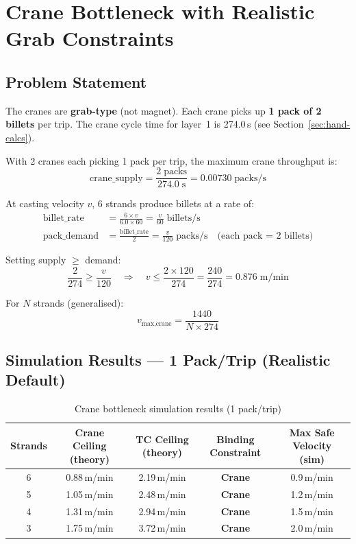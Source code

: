 \documentclass[11pt,a4paper]{article}
\begin{document}
\section{Crane Bottleneck with Realistic Grab Constraints}
\label{sec:crane-bottleneck}

\subsection{Problem Statement}

The cranes are \textbf{grab-type} (not magnet). Each crane picks up \textbf{1 pack of 2 billets} per trip. The crane cycle time for layer~1 is 274.0\,s (see Section~\ref{sec:hand-calcs}).

With 2 cranes each picking 1 pack per trip, the maximum crane throughput is:
\begin{equation}
\text{crane\_supply} = \frac{2\;\text{packs}}{274.0\;\text{s}} = 0.00730\;\text{packs/s}
\end{equation}

At casting velocity $v$, 6 strands produce billets at a rate of:
\begin{align}
\text{billet\_rate} &= \frac{6 \times v}{6.0 \times 60} = \frac{v}{60}\;\text{billets/s} \\
\text{pack\_demand} &= \frac{\text{billet\_rate}}{2} = \frac{v}{120}\;\text{packs/s}\quad\text{(each pack = 2 billets)}
\end{align}

Setting supply $\geq$ demand:
\begin{equation}
\frac{2}{274} \geq \frac{v}{120} \quad\Rightarrow\quad v \leq \frac{2 \times 120}{274} = \frac{240}{274} = 0.876\;\text{m/min}
\end{equation}

For $N$ strands (generalised):
\begin{equation}
v_\text{max,crane} = \frac{1440}{N \times 274}
\end{equation}

\subsection{Simulation Results --- 1 Pack/Trip (Realistic Default)}

\begin{table}[H]
\centering
\caption{Crane bottleneck simulation results (1 pack/trip)}
\label{tab:crane-bottleneck}
\begin{tabular}{@{}ccccc@{}}
\toprule
Strands & Crane Ceiling (theory) & TC Ceiling (theory) & Binding Constraint & Max Safe Velocity (sim) \\
\midrule
6 & 0.88\,m/min & 2.19\,m/min & \textbf{Crane} & 0.9\,m/min \\
5 & 1.05\,m/min & 2.48\,m/min & \textbf{Crane} & 1.2\,m/min \\
4 & 1.31\,m/min & 2.94\,m/min & \textbf{Crane} & 1.5\,m/min \\
3 & 1.75\,m/min & 3.72\,m/min & \textbf{Crane} & 2.0\,m/min \\
\bottomrule
\end{tabular}
\end{table}
\end{document}
